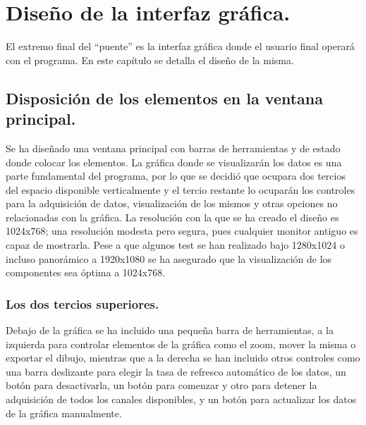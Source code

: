 \chapter{Diseño de la interfaz gráfica.}\label{chap:GUI}
 
 
	El extremo final del ``puente'' es la interfaz gráfica donde el usuario final operará con el programa. En este capítulo se detalla el diseño de la misma.
	
	\section{Disposición de los elementos en la ventana principal.} \label{sec:gui_mainframe}
	Se ha diseñado una ventana principal con barras de herramientas y de estado donde colocar los elementos. La gráfica donde se visualizarán los datos es una parte fundamental del programa, por lo que se decidió que ocupara dos tercios del espacio disponible verticalmente y el tercio restante lo ocuparán los controles para la adquisición de datos, visualización de los mismos y otras opciones no relacionadas con la gráfica. La resolución con la que se ha creado el diseño es 1024x768; una resolución modesta pero segura, pues cualquier monitor antiguo es capaz de mostrarla. Pese a que algunos test se han realizado bajo 1280x1024 o incluso panorámico a 1920x1080 se ha asegurado que la visualización de los componentes sea óptima a 1024x768. 
	
	\subsection{Los dos tercios superiores.}\label{sec:gui_graph}
		Debajo de la gráfica se ha incluido una pequeña barra de herramientas, a la izquierda para controlar elementos de la gráfica como el zoom, mover la misma o exportar el dibujo, mientras que a la derecha se han incluido otros controles como una barra deslizante para elegir la tasa de refresco automático de los datos, un botón para desactivarla, un botón para comenzar y otro para detener la adquisición de todos los canales disponibles, y un botón para actualizar los datos de la gráfica manualmente. 

